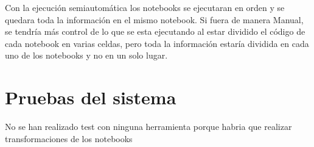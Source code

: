 Con la ejecución semiautomática los notebooks se ejecutaran en orden y se quedara toda la información en el mismo notebook.
Si fuera de manera Manual, se tendría más control de lo que se esta ejecutando al estar dividido el código de cada notebook en varias celdas, pero toda la información estaría dividida en cada uno de los notebooks y no en un solo lugar.



\section{Pruebas del sistema}

No se han realizado test con ninguna herramienta porque habria que realizar transformaciones de los notebooks


